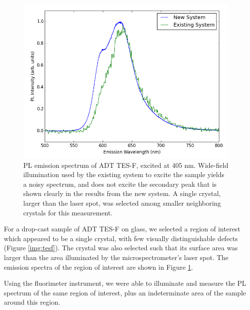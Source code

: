 \begin{figure}[H]
    \centering
    \includegraphics[width=.8\textwidth]{./img/tesf-2.png}%
    \caption[PL emission spectrum of ADT TES-F, excited at 405nm.]{PL emission spectrum of ADT TES-F, excited at 405 nm.
    Wide-field illumination used by the existing system to excite the sample
    yields a noisy spectrum, and does not excite the secondary peak that is 
    shown clearly in the results from the new system. A single crystal, larger than the laser spot, was selected among smaller neighboring crystals for this measurement. %
    }
    \label{fig:pl-adt-tesf}
\end{figure}

For a drop-cast sample of ADT TES-F on glass, we selected a region of interest which appeared to be a single crystal, with few visually distinguishable defects (Figure \ref{img:tesf}). The crystal was also selected such that its surface area was larger than the area illuminated by the microspectrometer's laser spot. The emission spectra of the region of interest are shown in Figure \ref{fig:pl-adt-tesf}.

Using the fluorimeter instrument, we were able to illuminate and measure the PL spectrum of the same region of interest, plus an indeterminate area of the sample around this region.

